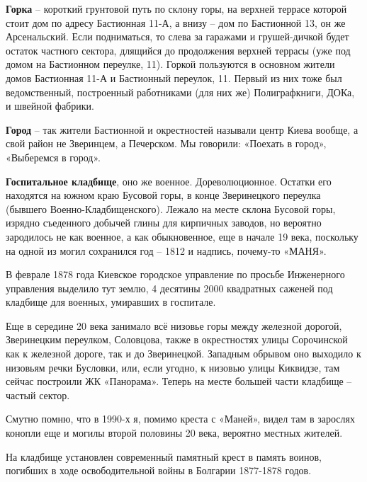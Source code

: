 \medskip

\textbf{Горка} – короткий грунтовой путь по склону горы, на верхней террасе которой стоит дом по адресу Бастионная 11-А, а внизу – дом по Бастионной 13, он же Арсенальский. Если подниматься, то слева за гаражами и грушей-дичкой будет остаток частного сектора, длящийся до продолжения верхней террасы (уже под домом на Бастионном переулке, 11). Горкой пользуются в основном жители домов Бастионная 11-А и Бастионный переулок, 11. Первый из них тоже был ведомственный, построенный работниками (для них же) Полиграфкниги, ДОКа, и швейной фабрики.\\

\medskip


\textbf{Город} – так жители Бастионной и окрестностей называли центр Киева вообще, а свой район не Зверинцем, а Печерском. Мы говорили: «Поехать в город», «Выберемся в город».\\

\medskip

\textbf{Госпитальное кладбище}, оно же военное. Дореволюционное. Остатки его находятся на южном краю Бусовой горы, в конце Зверинецкого переулка (бывшего Военно-Кладбищенско\-го). Лежало на месте склона Бусовой горы, изрядно съеденного добычей глины для кирпичных заводов, но вероятно зародилось не как военное, а как обыкновенное, еще в начале 19 века, поскольку на одной из могил сохранился год – 1812 и надпись, почему-то «МАНЯ».

В феврале 1878 года Киевское городское управление по просьбе Инженерного управления выделило тут землю, 4 десятины 2000 квадратных саженей под кладбище для военных, умиравших в госпитале. 

Еще в середине 20 века занимало всё низовье горы между железной дорогой, Зверинецким переулком, Соловцова, также в окрестностях улицы Сорочинской как к железной дороге, так и до Зверинецкой. Западным обрывом оно выходило к низовьям речки Бусловки, или, если угодно, к низовью улицы Киквидзе, там сейчас построили ЖК «Панорама». Теперь на месте большей части кладбище – частый сектор.

Смутно помню, что в 1990-х я, помимо креста с «Маней», видел там в зарослях конопли еще и могилы второй половины 20 века, вероятно местных жителей.

На кладбище установлен современный памятный крест в память воинов, погибших в ходе освободительной войны в Болгарии 1877-1878 годов.\\


